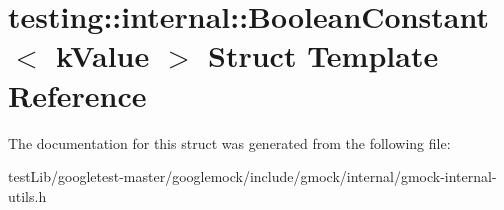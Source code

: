 \hypertarget{structtesting_1_1internal_1_1BooleanConstant}{}\section{testing\+:\+:internal\+:\+:Boolean\+Constant$<$ k\+Value $>$ Struct Template Reference}
\label{structtesting_1_1internal_1_1BooleanConstant}


The documentation for this struct was generated from the following file\+:\begin{DoxyCompactItemize}
\item 
test\+Lib/googletest-\/master/googlemock/include/gmock/internal/gmock-\/internal-\/utils.\+h\end{DoxyCompactItemize}
